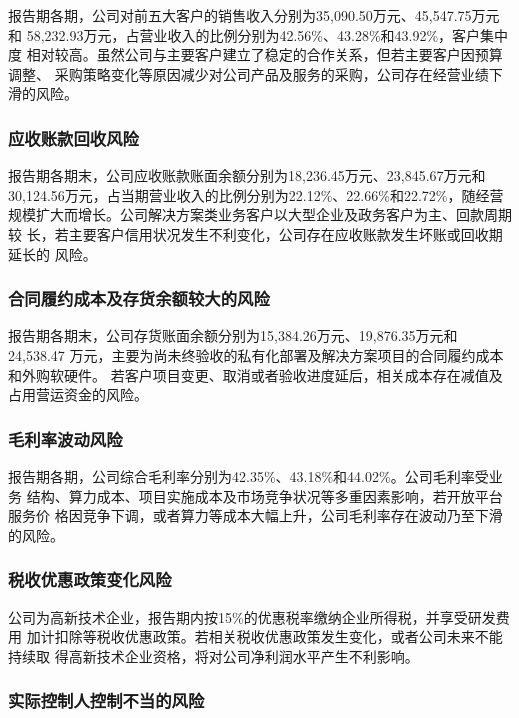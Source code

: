 报告期各期，公司对前五大客户的销售收入分别为35,090.50万元、45,547.75万元和
58,232.93万元，占营业收入的比例分别为42.56\%、43.28\%和43.92\%，客户集中度
相对较高。虽然公司与主要客户建立了稳定的合作关系，但若主要客户因预算调整、
采购策略变化等原因减少对公司产品及服务的采购，公司存在经营业绩下滑的风险。

\subsubsection{应收账款回收风险}

报告期各期末，公司应收账款账面余额分别为18,236.45万元、23,845.67万元和
30,124.56万元，占当期营业收入的比例分别为22.12\%、22.66\%和22.72\%，随经营
规模扩大而增长。公司解决方案类业务客户以大型企业及政务客户为主、回款周期较
长，若主要客户信用状况发生不利变化，公司存在应收账款发生坏账或回收期延长的
风险。

\subsubsection{合同履约成本及存货余额较大的风险}

报告期各期末，公司存货账面余额分别为15,384.26万元、19,876.35万元和24,538.47
万元，主要为尚未终验收的私有化部署及解决方案项目的合同履约成本和外购软硬件。
若客户项目变更、取消或者验收进度延后，相关成本存在减值及占用营运资金的风险。

\subsubsection{毛利率波动风险}

报告期各期，公司综合毛利率分别为42.35\%、43.18\%和44.02\%。公司毛利率受业务
结构、算力成本、项目实施成本及市场竞争状况等多重因素影响，若开放平台服务价
格因竞争下调，或者算力等成本大幅上升，公司毛利率存在波动乃至下滑的风险。

\subsubsection{税收优惠政策变化风险}

公司为高新技术企业，报告期内按15\%的优惠税率缴纳企业所得税，并享受研发费用
加计扣除等税收优惠政策。若相关税收优惠政策发生变化，或者公司未来不能持续取
得高新技术企业资格，将对公司净利润水平产生不利影响。

\subsubsection{实际控制人控制不当的风险}

